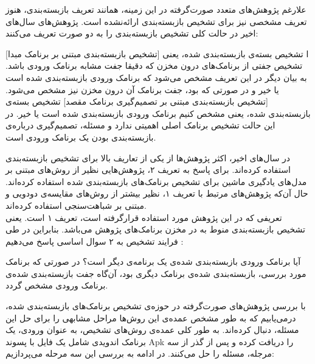 علارغم پژوهش‌های متعدد صورت‌گرفته در این زمینه، همانند تعریف بازبسته‌بندی، هنوز تعریف مشخصی نیز برای تشخیص بازبسته‌بندی ارائه‌نشده‌ است. پژوهش‌های سال‌های اخیر در حالت کلی تشخیص بازبسته‌بندی را به دو صورت تعریف می‌کنند:‌



[تشخیص بازبسته‌بندی مبتنی بر برنامک مبدا]
ا\label{tarif1} تشخیص بسته‌ی بازبسته‌بندی شده، یعنی تشخیص جفتی از برنامک‌های درون مخزن که دقیقا جفت مشابه برنامک ورودی باشد. به بیان دیگر در این تعریف مشخص می‌شود که برنامک ورودی بازبسته‌بندی شده است یا خیر و در صورتی که بود، جفت برنامک آن درون مخزن نیز مشخص می‌شود.
[تشخیص بازبسته‌بندی مبتنی بر تصمیم‌گیری برنامک مقصد]
\label{tarif2} تشخیص بسته‌ی بازبسته‌بندی شده، یعنی مشخص کنیم برنامک ورودی بازبسته‌بندی شده است یا خیر. در این حالت تشخیص برنامک اصلی اهمیتی ندارد و مسئله، تصمیم‌گیری  درباره‌ی بازبسته‌بندی بودن یک برنامک ورودی است.






در سال‌های اخیر، اکثر پژوهش‌ها از یکی از تعاریف بالا برای تشخیص بازبسته‌بندی استفاده کرده‌اند. برای پاسخ به تعریف ۲، پژوهش‌هایی نظیر  از روش‌های مبتنی بر مدل‌های یادگیری ماشین برای تشخیص برنامک‌های بازبسته‌‌بندی شده استفاده کرده‌اند. حال آن‌که پژوهش‌های مرتبط با تعریف ۱، نظیر   بیشتر از روش‌های مقایسه‌ی دودویی و مبتنی بر شباهت‌سنجی استفاده کرده‌اند. \\
تعریفی که در این پژوهش مورد استفاده قرار‌گرفته‌ است، تعریف ۱ است. یعنی تشخیص بازبسته‌بندی منوط به در مخزن برنامک‌های پژوهش می‌باشد. بنابراین در طی فرایند تشخیص به ۲ سوال اساسی پاسخ می‌دهیم :‌

 آیا برنامک ورودی بازبسته‌بندی شده‌ی یک برنامه‌ی دیگر است؟‌
 در صورتی که برنامک مورد بررسی، بازبسته‌بندی شده‌ی برنامک دیگری بود، آن‌گاه جفت بازبسته‌بندی شده‌ی برنامک ورودی مشخص گردد.


با بررسی پژوهش‌های صورت‌گرفته در حوزه‌ی تشخیص برنامک‌های بازبسته‌بندی شده، درمی‌یابیم که به طور مشخص عمده‌ی این روش‌ها مراحل مشابهی را برای حل این مسئله، دنبال کرده‌اند. به طور کلی عمده‌ی روش‌های تشخیص، به عنوان ورودی، یک برنامک اندویدی شامل یک فایل با پسوند Apk را دریافت کرده و پس از گذر از سه مرجله، مسئله را حل می‌کنند. در ادامه به بررسی این سه مرحله می‌پردازیم:‌


